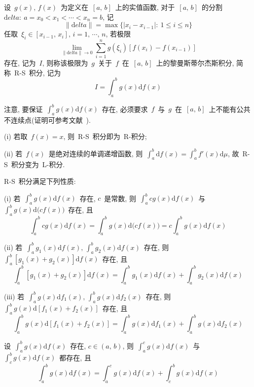 \begin{Definition}
设~$g(x),\,f(x)$~为定义在~$[a,\,b]$~上的实值函数, 对于~$[a,\,b]$~的分割~$\mathrm{d}elta:\: a=x_0 < x_1 < \cdots < x_n =b$, 记
\[
\|\mathrm{d}elta\|=\max\{|x_i-x_{i-1}|: \: 1 \leqslant i \leqslant n\}
\]
任取~$\xi_i \in [x_{i-1},\,x_i], \, i=1,\,\cdots,\,n$, 若极限
\[
\lim_{\|\mathrm{d}elta\| \to 0} \sum_{i=1}^n g(\xi_i)[f(x_i)-f(x_{i-1})]
\]
存在, 记为~$I$, 则称该极限为~$g$~关于~$f$~在~$[a,\,b]$~上的黎曼\raisebox{0.5mm}{--}斯蒂尔杰斯积分, 简称~R-S~积分, 记为
\[
I = \int_a^b g(x) \mathrm{d} f(x)
\]
\end{Definition}

注意, 要保证~$\int_a^b g(x) \mathrm{d} f(x)$~存在, 必须要求~$f$~与~$g$~在~$[a,\,b]$~上不能有公共不连续点(证明可参考文献~\cite{zhou}).

\begin{Remark}
(i) 若取~$f(x)=x$, 则~R-S~积分即为~R-积分;

(ii) 若~$f(x)$~是绝对连续的单调递增函数, 则~$\int_a^b \mathrm{d} f(x) = \int_a^b f'(x) \mathrm{d} \mu$, 故~R-S~积分变为~L-积分.
\end{Remark}

\begin{Proposition}
R-S~积分满足下列性质:

(i) 若~$\int_a^b g(x) \mathrm{d} f(x)$~存在, $c$~是常数, 则~$\int_a^b cg(x) \mathrm{d} f(x)$~与~$\int_a^b g(x) \mathrm{d} \big(cf(x)\big)$~存在, 且
\[
\int_a^b cg(x) \mathrm{d} f(x) = \int_a^b g(x) \mathrm{d} \big(cf(x)\big) = c\int_a^b g(x) \mathrm{d} f(x)
\]

(ii) 若~$\int_a^b g_1(x) \mathrm{d} f(x), \,\int_a^b g_2(x) \mathrm{d} f(x)$~存在, 则~$\int_a^b [g_1(x) + g_2(x)] \mathrm{d} f(x)$~存在, 且
\[
\int_a^b [g_1(x) + g_2(x)] \mathrm{d} f(x) = \int_a^b g_1(x) \mathrm{d} f(x) + \int_a^b g_2(x) \mathrm{d} f(x)
\]

(iii) 若~$\int_a^b g(x) \mathrm{d} f_1(x), \,\int_a^b g(x) \mathrm{d} f_2(x)$~存在, 则~$\int_a^b g(x) \mathrm{d} [f_1(x)+f_2(x)]$~存在, 且
\[
\int_a^b g(x) \mathrm{d} [f_1(x)+f_2(x)] = \int_a^b g(x) \mathrm{d} f_1(x) + \int_a^b g(x) \mathrm{d} f_2(x)
\]
\end{Proposition}

\begin{Proposition}
设~$\int_a^b g(x) \mathrm{d} f(x)$~存在, $c \in (a,\,b)$, 则~$\int_a^c g(x) \mathrm{d} f(x)$~与~$\int_c^b g(x) \mathrm{d} f(x)$~都存在, 且
\[
\int_a^b g(x) \mathrm{d} f(x) = \int_a^c g(x) \mathrm{d} f(x) + \int_c^b g(x) \mathrm{d} f(x)
\]
\end{Proposition}

